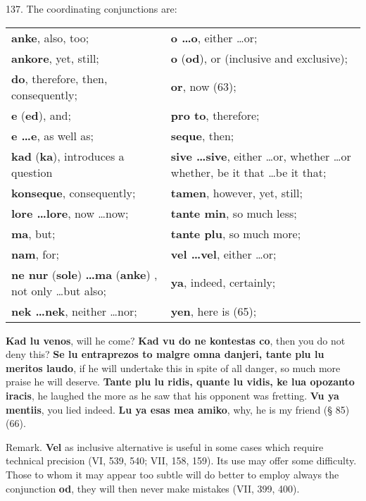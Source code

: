 137. The coordinating conjunctions are: \\
\begin{tabular}{l l}
\textbf{anke}, also, too; & \textbf{o \ldots o}, either \ldots or; \\
\textbf{ankore}, yet, still; & \textbf{o} (\textbf{od}), or (inclusive and exclusive); \\
\textbf{do}, therefore, then, consequently; & \textbf{or}, now (63); \\
\textbf{e} (\textbf{ed}), and; & \textbf{pro to}, therefore; \\
\textbf{e \ldots e}, as well as; & \textbf{seque}, then; \\
\textbf{kad} (\textbf{ka}), introduces a question & \textbf{sive \ldots sive}, either \ldots or, whether \ldots or whether, be it that \ldots be it that; \\
\textbf{konseque}, consequently; & \textbf{tamen}, however, yet, still; \\
\textbf{lore \ldots lore}, now \ldots now; & \textbf{tante min}, so much less; \\
\textbf{ma}, but; & \textbf{tante plu}, so much more; \\
\textbf{nam}, for; & \textbf{vel \ldots vel}, either \ldots or; \\
\textbf{ne nur }(\textbf{sole})\textbf{ \ldots ma }(\textbf{anke}) , not only \ldots but also; & \textbf{ya}, indeed, certainly; \\
\textbf{nek \ldots nek}, neither \ldots nor; & \textbf{yen}, here is (65);
\end{tabular}

\textbf{Kad lu venos}, will he come? \textbf{Kad vu do ne kontestas co}, then you do not deny this? \textbf{Se lu entraprezos to malgre omna danjeri, tante plu lu meritos laudo}, if he will undertake this in spite of all danger, so much more praise he will deserve. \textbf{Tante plu lu ridis, quante lu vidis, ke lua opozanto iracis}, he laughed the more as he saw that his opponent was fretting. \textbf{Vu ya mentiis}, you lied indeed. \textbf{Lu ya esas mea amiko}, why, he is my friend (§ 85) (66).

\small Remark. \textbf{Vel} as inclusive alternative is useful in some cases which require technical precision (VI, 539, 540; VII, 158, 159). Its use may offer some difficulty. Those to whom it may appear too subtle will do better to employ always the conjunction \textbf{od}, they will then never make mistakes (VII, 399, 400). \normalsize

